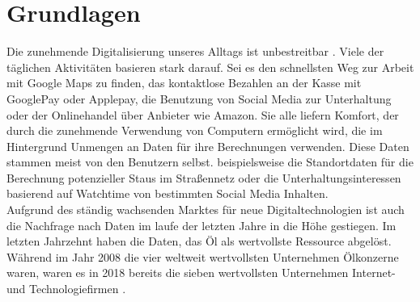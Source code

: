 \documentclass{scrreprt}
\begin{document}
\chapter{Grundlagen}
Die zunehmende Digitalisierung unseres Alltags ist unbestreitbar \cite{dt-digitalisierung-stat}. Viele der täglichen Aktivitäten basieren stark darauf. Sei es den schnellsten Weg zur Arbeit mit Google Maps zu finden, das kontaktlose Bezahlen an der Kasse mit GooglePay oder Applepay, die Benutzung von Social Media zur Unterhaltung oder der Onlinehandel über Anbieter wie Amazon. Sie alle liefern Komfort, der durch die zunehmende Verwendung von Computern ermöglicht wird, die im Hintergrund Unmengen an Daten für ihre Berechnungen verwenden. Diese Daten stammen meist von den Benutzern selbst. beispielsweise die Standortdaten für die Berechnung potenzieller Staus im Straßennetz \cite{dt-googlemaps-staus} oder die Unterhaltungsinteressen basierend auf Watchtime von bestimmten Social Media Inhalten. \\
Aufgrund des ständig wachsenden Marktes für neue Digitaltechnologien ist auch die Nachfrage nach Daten im laufe der letzten Jahre in die Höhe gestiegen. Im letzten Jahrzehnt haben die Daten, das Öl als wertvollste Ressource abgelöst. Während im Jahr 2008 die vier weltweit wertvollsten Unternehmen Ölkonzerne waren, waren es in 2018 bereits die sieben wertvollsten Unternehmen Internet- und Technologiefirmen \cite{dt-falck2020rohstoff}. 
\end{document}
